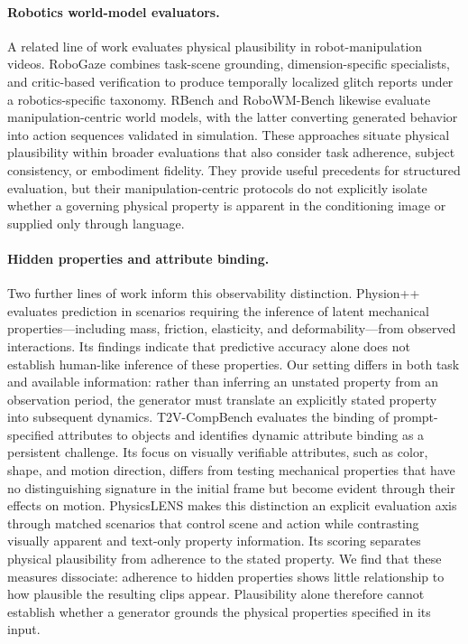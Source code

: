 \documentclass{article} %
\begin{document}
\paragraph{Robotics world-model evaluators.}
A related line of work evaluates physical plausibility in robot-manipulation videos. RoboGaze \citep{nguyen2026robogazeevaluatingrobotworld} combines task-scene grounding, dimension-specific specialists, and critic-based verification to produce temporally localized glitch reports under a robotics-specific taxonomy. RBench \citep{RBench_deng2026rethinkingvideogenerationmodel} and RoboWM-Bench \citep{jiang2026robowmbenchbenchmarkevaluatingworld} likewise evaluate manipulation-centric world models, with the latter converting generated behavior into action sequences validated in simulation. These approaches situate physical plausibility within broader evaluations that also consider task adherence, subject consistency, or embodiment fidelity. They provide useful precedents for structured evaluation, but their manipulation-centric protocols do not explicitly isolate whether a governing physical property is apparent in the conditioning image or supplied only through language.

\paragraph{Hidden properties and attribute binding.}
Two further lines of work inform this observability distinction. Physion++ \citep{tung2023physionevaluatingphysicalscene} evaluates prediction in scenarios requiring the inference of latent mechanical properties---including mass, friction, elasticity, and deformability---from observed interactions. Its findings indicate that predictive accuracy alone does not establish human-like inference of these properties. Our setting differs in both task and available information: rather than inferring an unstated property from an observation period, the generator must translate an explicitly stated property into subsequent dynamics. T2V-CompBench \citep{sun2025t2vcompbenchcomprehensivebenchmarkcompositional} evaluates the binding of prompt-specified attributes to objects and identifies dynamic attribute binding as a persistent challenge. Its focus on visually verifiable attributes, such as color, shape, and motion direction, differs from testing mechanical properties that have no distinguishing signature in the initial frame but become evident through their effects on motion. PhysicsLENS makes this distinction an explicit evaluation axis through matched scenarios that control scene and action while contrasting visually apparent and text-only property information. Its scoring separates physical plausibility from adherence to the stated property. We find that these measures dissociate: adherence to hidden properties shows little relationship to how plausible the resulting clips appear. Plausibility alone therefore cannot establish whether a generator grounds the physical properties specified in its input.
\end{document}
